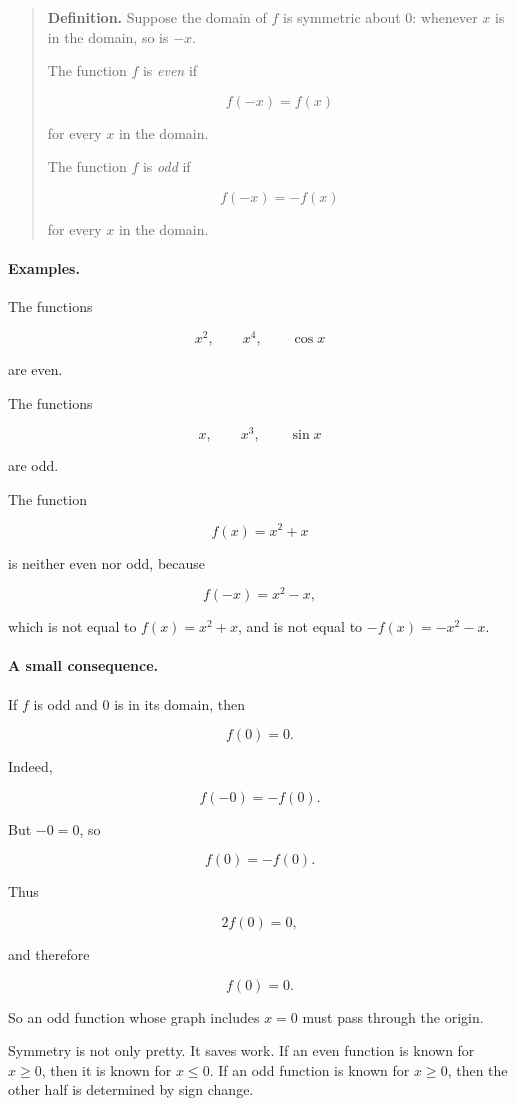 \begin{quote}
\textbf{Definition.}
Suppose the domain of \(f\) is symmetric about \(0\): whenever \(x\) is in the domain, so is \(-x\).

The function \(f\) is \emph{even} if

\[
f(-x)=f(x)
\]

for every \(x\) in the domain.

The function \(f\) is \emph{odd} if

\[
f(-x)=-f(x)
\]

for every \(x\) in the domain.
\end{quote}

\paragraph{Examples.}
The functions

\[
x^2,\qquad x^4,\qquad \cos x
\]

are even.

The functions

\[
x,\qquad x^3,\qquad \sin x
\]

are odd.

The function

\[
f(x)=x^2+x
\]

is neither even nor odd, because

\[
f(-x)=x^2-x,
\]

which is not equal to \(f(x)=x^2+x\), and is not equal to \(-f(x)=-x^2-x\).

\paragraph{A small consequence.}
If \(f\) is odd and \(0\) is in its domain, then

\[
f(0)=0.
\]

Indeed,

\[
f(-0)=-f(0).
\]

But \(-0=0\), so

\[
f(0)=-f(0).
\]

Thus

\[
2f(0)=0,
\]

and therefore

\[
f(0)=0.
\]

So an odd function whose graph includes \(x=0\) must pass through the origin.

Symmetry is not only pretty. It saves work. If an even function is known for \(x\ge 0\), then it is known for \(x\le 0\). If an odd function is known for \(x\ge 0\), then the other half is determined by sign change.

